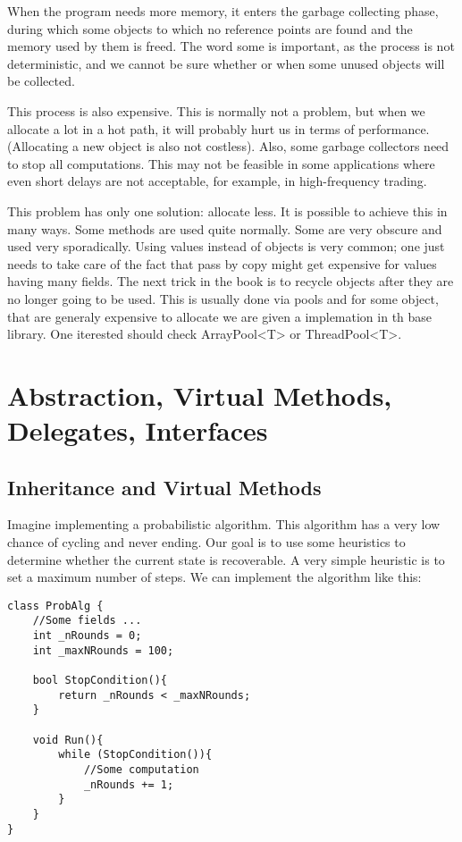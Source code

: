 When the program needs more memory, it enters the garbage collecting phase, during which some objects to which no reference points are found and the memory used by them is freed. The word some is important, as the process is not deterministic, and we cannot be sure whether or when some unused objects will be collected.

This process is also expensive. This is normally not a problem, but when we allocate a lot in a hot path, it will probably hurt us in terms of performance. (Allocating a new object is also not costless). Also, some garbage collectors need to stop all computations. This may not be feasible in some applications where even short delays are not acceptable, for example, in high-frequency trading.

This problem has only one solution: allocate less. It is possible to achieve this in many ways. Some methods are used quite normally. Some are very obscure and used very sporadically. Using values instead of objects is very common; one just needs to take care of the fact that pass by copy might get expensive for values having many fields. The next trick in the book is to recycle objects after they are no longer going to be used. This is usually done via pools and for some object, that are generaly expensive to allocate we are given a implemation in th base library. One iterested should check ArrayPool<T> or ThreadPool<T>.

\section{Abstraction, Virtual Methods, Delegates, Interfaces}

\subsection{Inheritance and Virtual Methods}
Imagine implementing a probabilistic algorithm. This algorithm has a very low chance of cycling and never ending. Our goal is to use some heuristics to determine whether the current state is recoverable. A very simple heuristic is to set a maximum number of steps. We can implement the algorithm like this:

\begin{lstlisting}
class ProbAlg {
    //Some fields ...
    int _nRounds = 0;
    int _maxNRounds = 100;

    bool StopCondition(){
        return _nRounds < _maxNRounds;
    }

    void Run(){
        while (StopCondition()){
            //Some computation 
            _nRounds += 1;
        }
    }
}
\end{lstlisting}

